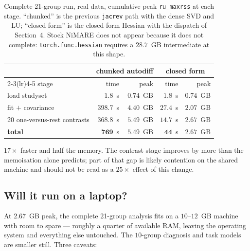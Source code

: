 \documentclass[11pt,a4paper]{article}
\theoremstyle{plain}
\theoremstyle{definition}
\begin{document}
\begin{table}[htbp]
\centering
\caption{Complete 21-group run, real data, cumulative peak \texttt{ru\_maxrss} at each stage.
``chunked'' is the previous \texttt{jacrev} path with the dense SVD and LU; ``closed form'' is
the closed-form Hessian with the dispatch of Section~4. Stock NiMARE does not appear because it
does not complete: \texttt{torch.func.hessian} requires a $28.7$~GB intermediate at this shape.}
\label{tab:e2e}
\begin{tabular}{lrrrr}
\toprule
& \multicolumn{2}{c}{chunked autodiff} & \multicolumn{2}{c}{closed form}\\
\cmidrule(lr){2-3}\cmidrule(lr){4-5}
stage & time & peak & time & peak\\
\midrule
load studyset & $1.8$~s & $0.74$~GB & $1.8$~s & $0.74$~GB\\
fit $+$ covariance & $398.7$~s & $4.40$~GB & $27.4$~s & $2.07$~GB\\
20 one-versus-rest contrasts & $368.8$~s & $5.49$~GB & $14.7$~s & $2.67$~GB\\
\midrule
\textbf{total} & $\mathbf{769}$~s & $\mathbf{5.49}$~GB & $\mathbf{44}$~s & $\mathbf{2.67}$~GB\\
\bottomrule
\end{tabular}
\end{table}

$17\times$ faster and half the memory. The contrast stage improves by more than the memoisation
alone predicts; part of that gap is likely contention on the shared machine and should not be
read as a $25\times$ effect of this change.

\subsection{Will it run on a laptop?}

At $2.67$~GB peak, the complete 21-group analysis fits on a $10$--$12$~GB machine with room to
spare --- roughly a quarter of available RAM, leaving the operating system and everything else
untouched. The $10$-group diagnosis and task models are smaller still. Three caveats:
\end{document}
